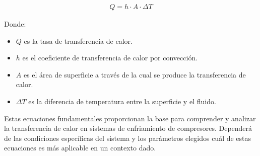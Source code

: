 \documentclass[11pt,a4paper]{article}  %
\begin{document}
\begin{enumerate}
\begin{align}
Q = h \cdot A \cdot \Delta T
\label{eq:conveccion}
\end{align}

Donde:
\begin{itemize}
    \item $Q$ es la tasa de transferencia de calor.
    \item $h$ es el coeficiente de transferencia de calor por convección.
    \item $A$ es el área de superficie a través de la cual se produce la transferencia de calor.
    \item $\Delta T$ es la diferencia de temperatura entre la superficie y el fluido.
\end{itemize}

\end{enumerate}

Estas ecuaciones fundamentales proporcionan la base para comprender y analizar la transferencia de calor en sistemas de enfriamiento de compresores. Dependerá de las condiciones específicas del sistema y los parámetros elegidos cuál de estas ecuaciones es más aplicable en un contexto dado.

\begin{table}[h]
\centering
{}
\caption{Posibles valores de constantes térmicas en el contexto del sistema de enfriamiento del compresor.}
\label{tab:constantes_termicas}
\end{table}
\end{document}
